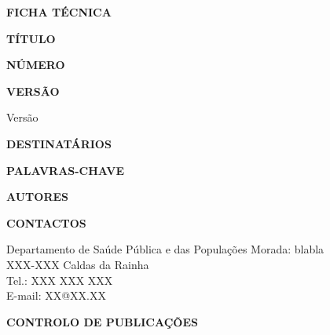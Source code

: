 \documentclass[a4paper,11pt]{report}
\newenvironment{fichatecnica}{%
  \clearpage
  \thispagestyle{fancy}
  \vspace*{-0.5cm}
  {\Large\bfseries\color{procegreen}FICHA TÉCNICA\par}
  \vspace{1cm}
}{%
  \clearpage
}
\begin{document}

\pagestyle{fancy}  %


\begin{fichatecnica}
{\large\bfseries TÍTULO\par}
\procedimentoTitulo
\vspace{0.5cm}

{\large\bfseries NÚMERO\par}
\procedimentoNumero
\vspace{0.5cm}

{\large\bfseries VERSÃO\par}
Versão \procedimentoVersao
\vspace{0.5cm}

{\large\bfseries DESTINATÁRIOS\par}
\procedimentoDestinatarios
\vspace{0.5cm}

{\large\bfseries PALAVRAS-CHAVE\par}
\procedimentoPalavrasChave
\vspace{0.5cm}

{\large\bfseries AUTORES\par}
\listarAutores
\vspace{0.5cm}

{\large\bfseries CONTACTOS\par}
Departamento de Saúde Pública e das Populações
Morada: blabla\\
XXX-XXX Caldas da Rainha\\
Tel.: XXX XXX XXX\\
E-mail: XX@XX.XX\\
\vspace{0.5cm}

{\large\bfseries CONTROLO DE PUBLICAÇÕES\par}
\vspace{0.3cm}
\begin{center}
\tabelaControloVersao
\end{center}
\end{fichatecnica}

\end{document}

